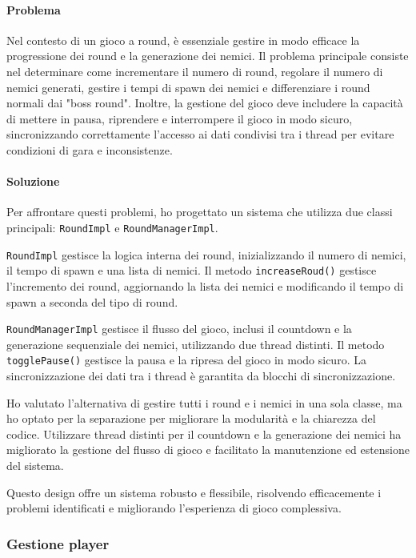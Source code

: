 \documentclass[a4paper,12pt]{report}
\begin{document}
\paragraph{Problema} Nel contesto di un gioco a round, è essenziale gestire in modo efficace la progressione dei round e la generazione dei nemici. Il problema principale consiste nel determinare come incrementare il numero di round, regolare il numero di nemici generati, gestire i tempi di spawn dei nemici e differenziare i round normali dai "boss round". Inoltre, la gestione del gioco deve includere la capacità di mettere in pausa, riprendere e interrompere il gioco in modo sicuro, sincronizzando correttamente l'accesso ai dati condivisi tra i thread per evitare condizioni di gara e inconsistenze.

\paragraph{Soluzione} Per affrontare questi problemi, ho progettato un sistema che utilizza due classi principali: \texttt{RoundImpl} e \texttt{RoundManagerImpl}.

\texttt{RoundImpl} gestisce la logica interna dei round, inizializzando il numero di nemici, il tempo di spawn e una lista di nemici. Il metodo \texttt{increaseRoud()} gestisce l'incremento dei round, aggiornando la lista dei nemici e modificando il tempo di spawn a seconda del tipo di round.

\texttt{RoundManagerImpl} gestisce il flusso del gioco, inclusi il countdown e la generazione sequenziale dei nemici, utilizzando due thread distinti. Il metodo \texttt{togglePause()} gestisce la pausa e la ripresa del gioco in modo sicuro. La sincronizzazione dei dati tra i thread è garantita da blocchi di sincronizzazione.

Ho valutato l'alternativa di gestire tutti i round e i nemici in una sola classe, ma ho optato per la separazione per migliorare la modularità e la chiarezza del codice. Utilizzare thread distinti per il countdown e la generazione dei nemici ha migliorato la gestione del flusso di gioco e facilitato la manutenzione ed estensione del sistema.

Questo design offre un sistema robusto e flessibile, risolvendo efficacemente i problemi identificati e migliorando l'esperienza di gioco complessiva.

\subsubsection{Gestione player}
\end{document}
